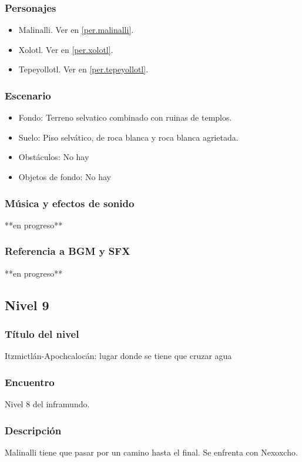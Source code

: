 \documentclass[11pt,letterpaper]{article}
\begin{document}
	\subsubsection{Personajes}
	\begin{itemize}
		\item Malinalli. Ver en \ref{per.malinalli}. 
		\item Xolotl. Ver en \ref{per.xolotl}.
		\item Tepeyollotl. Ver en \ref{per.tepeyollotl}.
	\end{itemize}
	\subsubsection{Escenario}
\begin{itemize} 
	\item Fondo: Terreno selvatico combinado con ruinas de templos.
	\item Suelo: Piso selvático, de roca blanca y roca blanca agrietada.
	\item Obstáculos: No hay
	\item Objetos de fondo: No hay
\end{itemize}		
	\subsubsection{Música y efectos de sonido}
	**en progreso**
	\subsubsection{Referencia a BGM y SFX}
	**en progreso**
	
		\subsection{Nivel 9}
	\subsubsection{Título del nivel}
	Itzmictlán-Apochcalocán: lugar donde se tiene que cruzar agua
	\subsubsection{Encuentro}
	Nivel 8 del inframundo.
	\subsubsection{Descripción}
	Malinalli tiene que pasar por un camino hasta el final. Se enfrenta con Nexoxcho.
\end{document}
